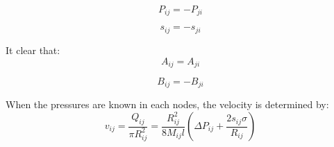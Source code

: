 	\begin{equation}
		P_{ij} = -P_{ji}
	\end{equation}
	
	\begin{equation}
		s_{ij} = -s_{ji}
	\end{equation}
	
	It clear that:
	\begin{equation} \label{eq:symmetry-of-a}
		A_{ij} = A_{ji}
	\end{equation}
	
	\begin{equation} \label{eq:symmetry-of-b}
		B_{ij} = -B_{ji}
	\end{equation}
	
	When the pressures are known in each nodes, the velocity is determined by:
	\begin{equation} \label{eq:velocity-from-pressures}
		v_{ij} = \frac{Q_{ij}}{\pi R_{ij}^2} = \frac{R_{ij}^2}{8M_{ij}l} \left( \Delta P_{ij} + \frac{2s_{ij} \sigma}{R_{ij}} \right)
	\end{equation}
